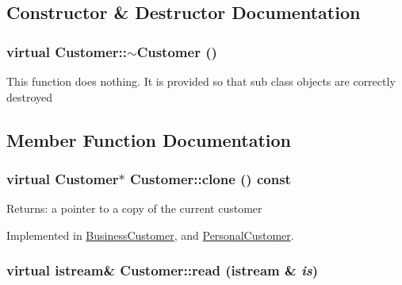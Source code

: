 \subsection{Constructor \& Destructor Documentation}
\hypertarget{classCustomer_7784915654b180d09696edded3db913d}{
\subsubsection[$\sim$Customer]{\setlength{\rightskip}{0pt plus 5cm}virtual Customer::$\sim$Customer ()}}
\label{classCustomer_7784915654b180d09696edded3db913d}


This function does nothing. It is provided so that sub class objects are correctly destroyed 

\subsection{Member Function Documentation}
\hypertarget{classCustomer_406fb74a887e5f0eb91aa49301534bb4}{
\subsubsection[clone]{\setlength{\rightskip}{0pt plus 5cm}virtual {\bf Customer}$\ast$ Customer::clone () const}}
\label{classCustomer_406fb74a887e5f0eb91aa49301534bb4}


\begin{Desc}
\item[Returns:]a pointer to a copy of the current customer \end{Desc}


Implemented in \hyperlink{classBusinessCustomer_6aaf68c4c9f64ed6cbb24855664d7244}{BusinessCustomer}, and \hyperlink{classPersonalCustomer_a1e9e9e14356c0ff7a3d97c999e44388}{PersonalCustomer}.\hypertarget{classCustomer_3327c4e5e7f3a9435f3b71372778386a}{
\subsubsection[read]{\setlength{\rightskip}{0pt plus 5cm}virtual istream\& Customer::read (istream \& {\em is})}}
\label{classCustomer_3327c4e5e7f3a9435f3b71372778386a}


